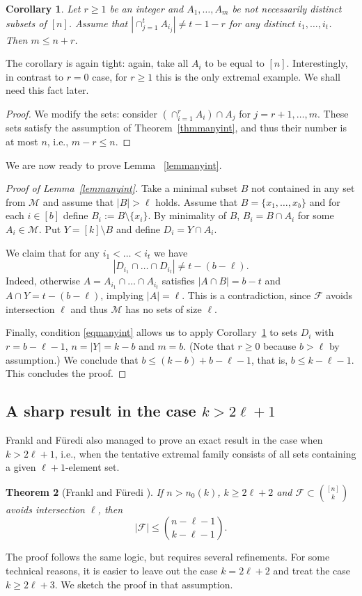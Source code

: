 \documentclass[graybox]{svmult}
\renewcommand{\le}{\leqslant}
\renewcommand{\ge}{\geqslant}
\newcommand{\ff}{\mathcal{F}}
\newcommand{\m}{\mathcal}
\newtheorem{thm}{Theorem}
\newtheorem{cor}[thm]{Corollary}
\begin{document}
\begin{cor}\label{cormanyint}
   Let $r\ge 1$ be an integer and $A_1,\ldots, A_m$ be not necessarily distinct subsets of $[n]$. Assume that $|\cap_{j=1}^t A_{i_j}|\ne t-1-r$ for any distinct $i_1,\ldots, i_t$. Then $m\le n+r$.
\end{cor}

The corollary is again tight: again, take all $A_i$ to be equal to $[n]$. Interestingly, in contrast to $r=0$ case, for $r\ge 1$ this is the only extremal example. We shall need this fact later.
\begin{proof}
  We modify the sets: consider  $(\cap_{i=1}^r A_i)\cap A_j$ for $j=r+1,\ldots,m$. These sets satisfy the assumption of Theorem~\ref{thmmanyint}, and thus their number is at most $n$, i.e., $m-r\le n$.
\end{proof}

We are now ready to prove Lemma ~\ref{lemmanyint}.

\begin{proof}[Proof of Lemma~\ref{lemmanyint}]
  Take a minimal subset $B$ not contained in any set from $\m M$ and assume that $|B|>\ell$ holds. Assume that $B = \{x_1,\ldots, x_b\}$ and for each $i\in [b]$ define $B_i:=B\setminus \{x_i\}$. By minimality of $B$, $B_i=B\cap A_i$ for some $A_i\in \m M$.  Put $Y = [k]\setminus B$ and define $D_i = Y\cap A_i$.

  We claim that for any $i_1<\ldots<i_t$ we have
  \begin{equation}\label{eqmanyint}|D_{i_1}\cap\ldots \cap D_{i_t}|\ne t-(b-\ell).\end{equation}
  Indeed, otherwise $A = A_{i_1}\cap\ldots \cap A_{i_t}$ satisfies $|A\cap B| = b-t$ and $A\cap Y = t-(b-\ell)$, implying $|A| =\ell$. This is a contradiction, since $\ff$ avoids intersection $\ell$ and thus $\m M$ has no sets of size $\ell$.

  Finally, condition \eqref{eqmanyint} allows us to apply Corollary~\ref{cormanyint} to sets $D_i$ with $r=b-\ell-1$, $n=|Y| =k-b$ and $m=b$. (Note that $r\ge 0$ because $b>\ell$ by assumption.) We conclude that $b\le (k-b)+b-\ell-1$, that is,  $b\le k-\ell-1$. This concludes the proof.
\end{proof}



\subsection{A sharp result in the case $k>2\ell+1$}\label{sec333} Frankl and F\"uredi also managed to prove an exact result in the case when $k>2\ell+1$, i.e., when the tentative extremal family consists of all sets containing a given $\ell+1$-element set.
\begin{thm}[Frankl and F\"uredi \cite{FF1}]\label{thmff2}
  If $n>n_0(k)$, $k\ge 2\ell+2$ and $\ff\subset {[n]\choose k}$ avoids intersection $\ell$, then
  $$|\ff| \le {n-\ell-1\choose k-\ell-1}.$$
\end{thm}
The proof follows the same logic, but requires several refinements. For some technical reasons, it is easier to leave out the case $k = 2\ell+2$ and treat the case $k\ge 2\ell+3$. We sketch the proof in that assumption.
\end{document}
